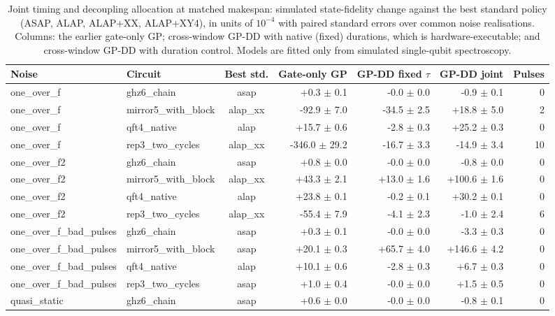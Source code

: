 \begin{table}[t]
\centering
\caption{Joint timing and decoupling allocation at matched makespan: simulated state-fidelity change against the best standard policy (ASAP, ALAP, ALAP+XX, ALAP+XY4), in units of $10^{-4}$ with paired standard errors over common noise realisations. Columns: the earlier gate-only GP; cross-window GP-DD with native (fixed) durations, which is hardware-executable; and cross-window GP-DD with duration control. Models are fitted only from simulated single-qubit spectroscopy.}\label{tab:c2}
\footnotesize
\begin{adjustbox}{max width=0.95\textwidth}
\begin{tabular}{llcrrrr}
\toprule
Noise & Circuit & Best std. & Gate-only GP & GP-DD fixed $\tau$ & GP-DD joint & Pulses \\
\midrule
one\_over\_f & ghz6\_chain & asap & +0.3 $\pm$ 0.1 & -0.0 $\pm$ 0.0 & -0.9 $\pm$ 0.1 & 0 \\
one\_over\_f & mirror5\_with\_block & alap\_xx & -92.9 $\pm$ 7.0 & -34.5 $\pm$ 2.5 & +18.8 $\pm$ 5.0 & 2 \\
one\_over\_f & qft4\_native & alap & +15.7 $\pm$ 0.6 & -2.8 $\pm$ 0.3 & +25.2 $\pm$ 0.3 & 0 \\
one\_over\_f & rep3\_two\_cycles & alap\_xx & -346.0 $\pm$ 29.2 & -16.7 $\pm$ 3.3 & -14.9 $\pm$ 3.4 & 10 \\
one\_over\_f2 & ghz6\_chain & asap & +0.8 $\pm$ 0.0 & -0.0 $\pm$ 0.0 & -0.8 $\pm$ 0.0 & 0 \\
one\_over\_f2 & mirror5\_with\_block & alap\_xx & +43.3 $\pm$ 2.1 & +13.0 $\pm$ 1.6 & +100.6 $\pm$ 1.6 & 0 \\
one\_over\_f2 & qft4\_native & alap & +23.8 $\pm$ 0.1 & -0.2 $\pm$ 0.1 & +30.2 $\pm$ 0.1 & 0 \\
one\_over\_f2 & rep3\_two\_cycles & alap\_xx & -55.4 $\pm$ 7.9 & -4.1 $\pm$ 2.3 & -1.0 $\pm$ 2.4 & 6 \\
one\_over\_f\_bad\_pulses & ghz6\_chain & asap & +0.3 $\pm$ 0.1 & -0.0 $\pm$ 0.0 & -3.3 $\pm$ 0.3 & 0 \\
one\_over\_f\_bad\_pulses & mirror5\_with\_block & asap & +20.1 $\pm$ 0.3 & +65.7 $\pm$ 4.0 & +146.6 $\pm$ 4.2 & 0 \\
one\_over\_f\_bad\_pulses & qft4\_native & alap & +10.1 $\pm$ 0.6 & -2.8 $\pm$ 0.3 & +6.7 $\pm$ 0.3 & 0 \\
one\_over\_f\_bad\_pulses & rep3\_two\_cycles & asap & +1.0 $\pm$ 0.4 & -0.0 $\pm$ 0.0 & +1.5 $\pm$ 0.5 & 0 \\
quasi\_static & ghz6\_chain & asap & +0.6 $\pm$ 0.0 & -0.0 $\pm$ 0.0 & -0.8 $\pm$ 0.1 & 0 \\

\end{tabular}
\end{adjustbox}
\end{table}
